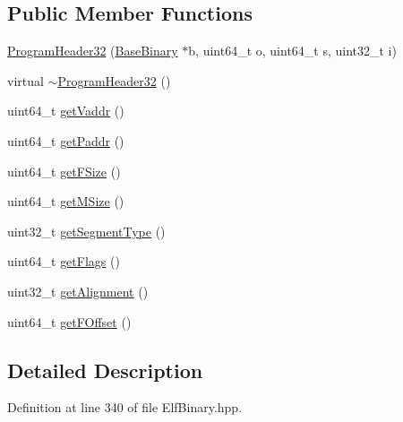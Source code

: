 \subsection*{\-Public \-Member \-Functions}
\begin{DoxyCompactItemize}
\item 
\hyperlink{class_e_p_a_x_1_1_elf_1_1_program_header32_a989edb2ff17c082517e51416331c1904}{\-Program\-Header32} (\hyperlink{class_e_p_a_x_1_1_base_binary}{\-Base\-Binary} $\ast$b, uint64\-\_\-t o, uint64\-\_\-t s, uint32\-\_\-t i)
\item 
virtual \hyperlink{class_e_p_a_x_1_1_elf_1_1_program_header32_a6ecc03af8b1082a3c39432d979c77aa0}{$\sim$\-Program\-Header32} ()
\item 
uint64\-\_\-t \hyperlink{class_e_p_a_x_1_1_elf_1_1_program_header32_a66eba7a23760b1a7955dc3821163a67e}{get\-Vaddr} ()
\item 
uint64\-\_\-t \hyperlink{class_e_p_a_x_1_1_elf_1_1_program_header32_a00042a0b2d817185d053d0647956261f}{get\-Paddr} ()
\item 
uint64\-\_\-t \hyperlink{class_e_p_a_x_1_1_elf_1_1_program_header32_a8eac270d2eff779a2f7de736f0b77113}{get\-F\-Size} ()
\item 
uint64\-\_\-t \hyperlink{class_e_p_a_x_1_1_elf_1_1_program_header32_a81d8e54c74130cc27f72ceb27a2044af}{get\-M\-Size} ()
\item 
uint32\-\_\-t \hyperlink{class_e_p_a_x_1_1_elf_1_1_program_header32_af00964314bdbe0342ea9ef1ff2a156ab}{get\-Segment\-Type} ()
\item 
uint64\-\_\-t \hyperlink{class_e_p_a_x_1_1_elf_1_1_program_header32_ac97782a148e1eacf90b38720e535cbef}{get\-Flags} ()
\item 
uint32\-\_\-t \hyperlink{class_e_p_a_x_1_1_elf_1_1_program_header32_a8b50e70db41f7b4f646f1ab2b54c227a}{get\-Alignment} ()
\item 
uint64\-\_\-t \hyperlink{class_e_p_a_x_1_1_elf_1_1_program_header32_a46bdc77ad9a585e058f0dadcc4e71831}{get\-F\-Offset} ()
\end{DoxyCompactItemize}


\subsection{\-Detailed \-Description}


\-Definition at line 340 of file \-Elf\-Binary.\-hpp.



